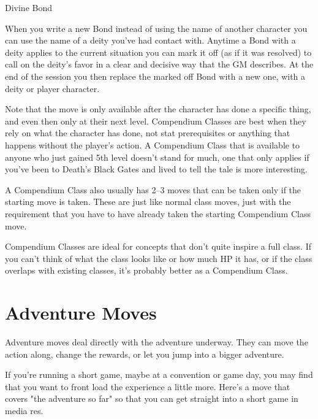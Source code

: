 \startExample
Divine Bond
\stopExample
       
\startExample
When you write a new Bond instead of using the name of another character you can use the name of a deity you've had contact with. Anytime a Bond with a deity applies to the current situation you can mark it off (as if it was resolved) to call on the deity's favor in a clear and decisive way that the GM describes. At the end of the session you then replace the marked off Bond with a new one, with a deity or player character.
\stopExample
       

Note that the move is only available after the character has done a specific thing, and even then only at their next level. Compendium Classes are best when they rely on what the character has done, not stat prerequisites or anything that happens without the player's action. A Compendium Class that is available to anyone who just gained 5th level doesn't stand for much, one that only applies if you've been to Death's Black Gates and lived to tell the tale is more interesting.

       

A Compendium Class also usually has 2–3 moves that can be taken only if the starting move is taken. These are just like normal class moves, just with the requirement that you have to have already taken the starting Compendium Class move.

       

Compendium Classes are ideal for concepts that don't quite inspire a full class. If you can't think of what the class looks like or how much HP it has, or if the class overlaps with existing classes, it's probably better as a Compendium Class.

       
\section{Adventure Moves}    
       

Adventure moves deal directly with the adventure underway. They can move the action along, change the rewards, or let you jump into a bigger adventure.

       

If you're running a short game, maybe at a convention or game day, you may find that you want to front load the experience a little more. Here's a move that covers "the adventure so far" so that you can get straight into a short game in media res.

